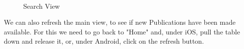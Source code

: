 \begin{figure}[H]
        \myfloatalign
         \quad
         \\
        \caption[Search View]{Search View}
\end{figure}

We can also refresh the main view, to see if new Publications have been made available. For this we need to go back to "Home" and, under iOS, pull the table down and release it, or, under Android, click on the refresh button.

